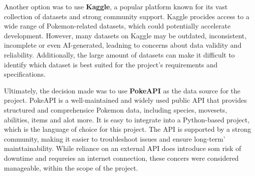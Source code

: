 Another option was to use \textbf{Kaggle}, a popular platform known for its vast collection
of datasets and strong community support. Kaggle procides access to a wide range of Pokemon-related
datasets, which could potentially accelerate development. However, many datasets on Kaggle
may be outdated, inconsistent, incomplete or even AI-generated, leadning to concerns about data 
validity and reliability. Additionally, the large amount of datasets can make it difficult to 
identify which dataset is best suited for the project's requirements and specifications.

Ultimately, the decision made was to use \textbf{PokeAPI} as the data source for the project. PokeAPI
is a well-maintained and widely used public API that provides structured and comprehensice Pokemon data,
including species, movesets, abilities, items and alot more. It is easy to integrate into
a Python-based project, which is the language of choice for this project. The API is 
supported by a strong community, making it easier to troubleshoot issues and ensure long-term'
mainttainability. While reliance on an external API does introduce som risk of downtime and 
requreies an internet connection, these concers were considered manageable, within the scope of the project.


